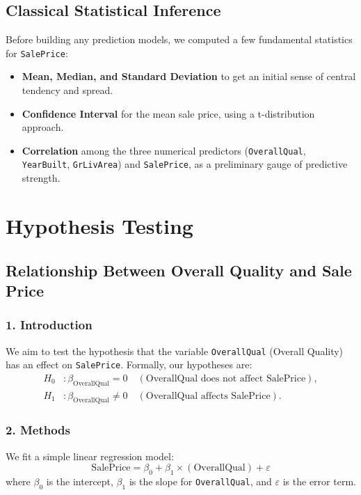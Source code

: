 \documentclass{article}
\begin{document}
\subsection{Classical Statistical Inference}

Before building any prediction models, we computed a few fundamental statistics for \texttt{SalePrice}:

\begin{itemize}
    \item \textbf{Mean, Median, and Standard Deviation} to get an initial sense of central tendency and spread.
    \item \textbf{Confidence Interval} for the mean sale price, using a t-distribution approach.
    \item \textbf{Correlation} among the three numerical predictors (\texttt{OverallQual}, \texttt{YearBuilt}, \texttt{GrLivArea}) and \texttt{SalePrice}, as a preliminary gauge of predictive strength.
\end{itemize}

\section*{Hypothesis Testing}

\subsection*{Relationship Between Overall Quality and Sale Price}

\subsubsection*{1. Introduction}
We aim to test the hypothesis that the variable \texttt{OverallQual} (Overall Quality) has an effect on \texttt{SalePrice}. Formally, our hypotheses are:
\[
\begin{aligned}
H_0 &: \beta_{\text{OverallQual}} = 0 \quad (\text{OverallQual does not affect SalePrice}),\\
H_1 &: \beta_{\text{OverallQual}} \neq 0 \quad (\text{OverallQual affects SalePrice}).
\end{aligned}
\]

\subsubsection*{2. Methods}
We fit a simple linear regression model:
\[
\text{SalePrice} = \beta_0 + \beta_1 \times (\text{OverallQual}) + \varepsilon
\]
where \(\beta_0\) is the intercept, \(\beta_1\) is the slope for \texttt{OverallQual}, and \(\varepsilon\) is the error term.
\end{document}
